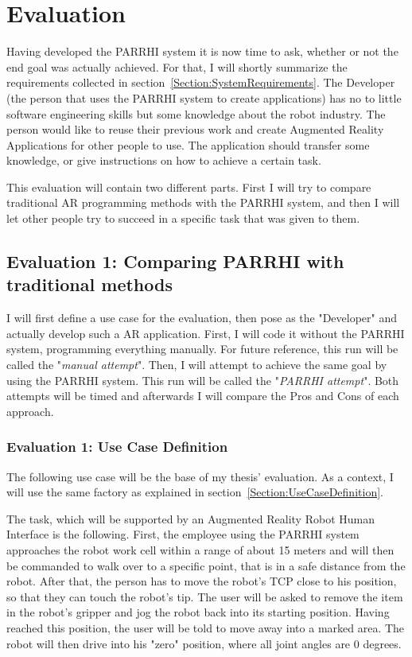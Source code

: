 \chapter{Evaluation}\label{Chap:Evaluation}

Having developed the PARRHI system it is now time to ask, whether or not the end goal was actually achieved. For that, I will shortly summarize the requirements collected in section~\ref{Section:SystemRequirements}. The Developer (the person that uses the PARRHI system to create applications) has no to little software engineering skills but some knowledge about the robot industry. The person would like to reuse their previous work and create Augmented Reality Applications for other people to use. The application should transfer some knowledge, or give instructions on how to achieve a certain task.

This evaluation will contain two different parts. First I will try to compare traditional AR programming methods with the PARRHI system, and then I will let other people try to succeed in a specific task that was given to them. 

\section{Evaluation 1: Comparing PARRHI with traditional methods}

I will first define a use case for the evaluation, then pose as the "Developer" and actually develop such a AR application. First, I will code it without the PARRHI system, programming everything manually. For future reference, this run will be called the "\textit{manual attempt}". Then, I will attempt to achieve the same goal by using the PARRHI system. This run will be called the "\textit{PARRHI attempt}". Both attempts will be timed and afterwards I will compare the Pros and Cons of each approach.

\subsection{Evaluation 1: Use Case Definition}
The following use case will be the base of my thesis' evaluation. As a context, I will use the same factory as explained in section~\ref{Section:UseCaseDefinition}. 

The task, which will be supported by an Augmented Reality Robot Human Interface is the following. First, the employee using the PARRHI system approaches the robot work cell within a range of about 15 meters and will then be commanded to walk over to a specific point, that is in a safe distance from the robot. After that, the person has to move the robot's TCP close to his position, so that they can touch the robot's tip. The user will be asked to remove the item in the robot's gripper and jog the robot back into its starting position. Having reached this position, the user will be told to move away into a marked area. The robot will then drive into his "zero" position, where all joint angles are 0 degrees. 

